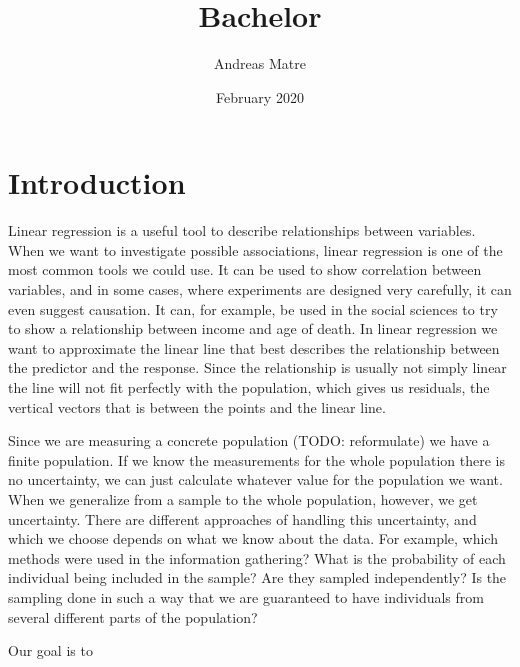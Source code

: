 \documentclass{article}
\title{Bachelor}
\author{Andreas Matre}
\date{February 2020}
\begin{document}
\newtheorem{definition}{Definition}[section]
\newtheorem{theorem}{Theorem}
\newtheorem{example}{Example}[section]


\maketitle

\begin{abstract}
\end{abstract}

\tableofcontents

\section{Introduction}

Linear regression is a useful tool to describe relationships between variables.
When we want to investigate possible associations, linear regression
is one of the most common tools we could use. It can be used to show correlation between
variables, and in some cases, where experiments are designed very carefully, it can even suggest causation.
It can, for example, be used in the social sciences to try to show a relationship
between income and age of death. In linear regression we want to approximate the
linear line that best describes the relationship between the predictor and the
response. Since the relationship is usually not simply linear the line will not
fit perfectly with the population, which gives us residuals, the vertical
vectors that is between the points and the linear line.



Since we are measuring a concrete population
(TODO: reformulate) we
have a finite population. If we know the measurements for the whole population there
is no uncertainty, we can just calculate whatever value for the population we
want. When we generalize from a sample to the whole population, however, we get
uncertainty. There are different approaches of handling this uncertainty, and
which we choose depends on what we know about the data. For example, which
methods were used in the information gathering?
What is the probability of each
individual being included in the sample? Are they sampled independently? Is the
sampling done in such a way that we are guaranteed to have individuals from
several different parts of the population?

Our goal is to 
\end{document}

